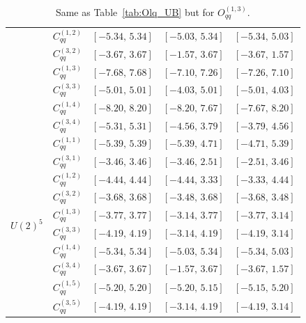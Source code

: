 \begin{table}[htbp]
{\begin{tabular}{ccccc}
        & $C_{qq}^{(1,2)}$ & $[-5.34,\, 5.34]$ & $[-5.03,\, 5.34]$ & $[-5.34,\, 5.03]$ \\
        & $C_{qq}^{(3,2)}$ & $[-3.67,\, 3.67]$ & $[-1.57,\, 3.67]$ & $[-3.67,\, 1.57]$ \\
        & $C_{qq}^{(1,3)}$ & $[-7.68,\, 7.68]$ & $[-7.10,\, 7.26]$ & $[-7.26,\, 7.10]$ \\
        & $C_{qq}^{(3,3)}$ & $[-5.01,\, 5.01]$ & $[-4.03,\, 5.01]$ & $[-5.01,\, 4.03]$ \\
        & $C_{qq}^{(1,4)}$ & $[-8.20,\, 8.20]$ & $[-8.20,\, 7.67]$ & $[-7.67,\, 8.20]$ \\
        & $C_{qq}^{(3,4)}$ & $[-5.31,\, 5.31]$ & $[-4.56,\, 3.79]$ & $[-3.79,\,4.56]$ \\
    \midrule
    \multirow{10}{*}{$U(2)^5$}
        & $C_{qq}^{(1,1)}$ & $[-5.39,\, 5.39]$ & $[-5.39,\, 4.71]$ & $[-4.71,\, 5.39]$ \\
        & $C_{qq}^{(3,1)}$ & $[-3.46,\, 3.46]$ & $[-3.46,\, 2.51]$ & $[-2.51,\, 3.46]$ \\
        & $C_{qq}^{(1,2)}$ & $[-4.44,\, 4.44]$ & $[-4.44,\, 3.33]$ & $[-3.33,\, 4.44]$ \\
        & $C_{qq}^{(3,2)}$ & $[-3.68,\, 3.68]$ & $[-3.48,\, 3.68]$ & $[-3.68,\, 3.48]$ \\
        & $C_{qq}^{(1,3)}$ & $[-3.77,\, 3.77]$ & $[-3.14,\, 3.77]$ & $[-3.77,\, 3.14]$ \\
        & $C_{qq}^{(3,3)}$ & $[-4.19,\, 4.19]$ & $[-3.14,\, 4.19]$ & $[-4.19,\, 3.14]$ \\
        & $C_{qq}^{(1,4)}$ & $[-5.34,\, 5.34]$ & $[-5.03,\, 5.34]$ & $[-5.34,\, 5.03]$ \\
        & $C_{qq}^{(3,4)}$ & $[-3.67,\, 3.67]$ & $[-1.57,\, 3.67]$ & $[-3.67,\, 1.57]$ \\
        & $C_{qq}^{(1,5)}$ & $[-5.20,\, 5.20]$ & $[-5.20,\, 5.15]$ & $[-5.15,\, 5.20]$ \\
        & $C_{qq}^{(3,5)}$ & $[-4.19,\, 4.19]$ & $[-3.14,\, 4.19]$ & $[-4.19,\, 3.14]$ \\
    \bottomrule
\end{tabular}}
\caption{Same as Table~\ref{tab:Olq_UB} but for $O_{qq}^{(1,3)}$.}
\label{tab:Oqq_UB}
\end{table}
 

